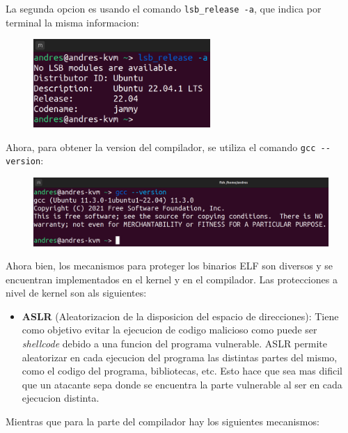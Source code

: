 \documentclass{article}
\begin{document}
La segunda opcion es usando el comando \verb|lsb_release -a|, que indica por terminal la misma informacion:

\begin{figure}[H]
    \centering
    \includegraphics[width=0.6\textwidth]{imagenes/Captura desde 2022-11-23 10-38-58.png}
\end{figure}

Ahora, para obtener la version del compilador, se utiliza el comando \verb|gcc --version|:

\begin{figure}[H]
    \includegraphics[width=\textwidth]{imagenes/Captura desde 2022-11-23 10-39-52.png}
\end{figure}

Ahora bien, los mecanismos para proteger los binarios ELF son diversos y se encuentran implementados en el kernel y en el compilador. Las protecciones a nivel de kernel son als siguientes:

\begin{itemize}
    \item \textbf{ASLR} (Aleatorizacion de la disposicion del espacio de direcciones): Tiene como objetivo evitar la ejecucion de codigo malicioso como puede ser \textit{shellcode} debido a una funcion del programa vulnerable. ASLR permite aleatorizar en cada ejecucion del programa las distintas partes del mismo, como el codigo del programa, bibliotecas, etc. Esto hace que sea mas dificil que un atacante sepa donde se encuentra la parte vulnerable al ser en cada ejecucion distinta.
\end{itemize}

Mientras que para la parte del compilador hay los siguientes mecanismos:
\end{document}
